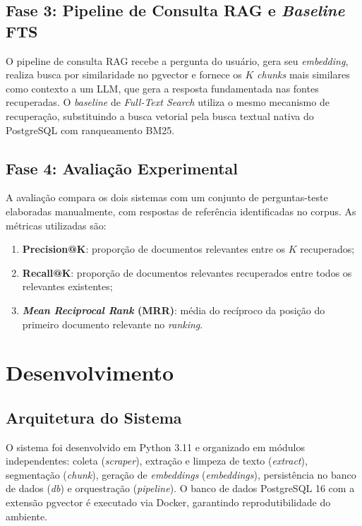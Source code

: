 \documentclass[
  12pt,
  openright,
  twoside,
  a4paper,
  brazil
]{abntex2}
\begin{document}
\section{Fase 3: Pipeline de Consulta RAG e \textit{Baseline} FTS}

O pipeline de consulta RAG recebe a pergunta do usuário, gera seu \textit{embedding}, realiza busca por similaridade no pgvector e fornece os $K$ \textit{chunks} mais similares como contexto a um LLM, que gera a resposta fundamentada nas fontes recuperadas. O \textit{baseline} de \textit{Full-Text Search} utiliza o mesmo mecanismo de recuperação, substituindo a busca vetorial pela busca textual nativa do PostgreSQL com ranqueamento BM25.

\section{Fase 4: Avaliação Experimental}

A avaliação compara os dois sistemas com um conjunto de perguntas-teste elaboradas manualmente, com respostas de referência identificadas no corpus. As métricas utilizadas são:

\begin{enumerate}[label=\alph*)]
  \item \textbf{Precision@K}: proporção de documentos relevantes entre os $K$ recuperados;
  \item \textbf{Recall@K}: proporção de documentos relevantes recuperados entre todos os relevantes existentes;
  \item \textbf{\textit{Mean Reciprocal Rank} (MRR)}: média do recíproco da posição do primeiro documento relevante no \textit{ranking}.
\end{enumerate}

\chapter{Desenvolvimento}

\section{Arquitetura do Sistema}

O sistema foi desenvolvido em Python 3.11 e organizado em módulos independentes: coleta (\textit{scraper}), extração e limpeza de texto (\textit{extract}), segmentação (\textit{chunk}), geração de \textit{embeddings} (\textit{embeddings}), persistência no banco de dados (\textit{db}) e orquestração (\textit{pipeline}). O banco de dados PostgreSQL 16 com a extensão pgvector é executado via Docker, garantindo reprodutibilidade do ambiente.
\end{document}
